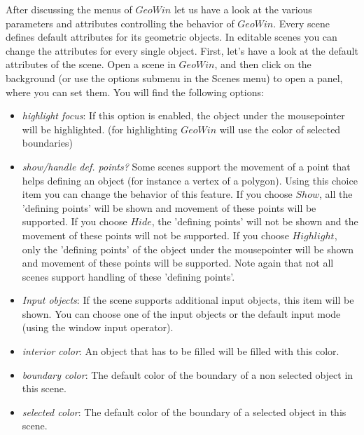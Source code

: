 After discussing the menus of $GeoWin$ let us have a look at the various parameters and attributes controlling
the behavior of $GeoWin$.
Every scene defines default attributes for its geometric objects. In editable scenes you can change the
attributes for every single object.
First, let's have a look at the default attributes of the scene. Open a scene in $GeoWin$, and then click on the 
background (or use the options submenu in the Scenes menu) to open a panel, where you can set them. You will find the following
options:

\begin{itemize}

\item {\em highlight focus}: If this option is enabled, the object under the mousepointer will be highlighted.
                 (for highlighting $GeoWin$ will use the color of selected boundaries)
		 
\item {\em show/handle def. points?} Some scenes support the movement of a point that helps defining
                 an object (for instance a vertex of a polygon). Using this choice item you can change
		 the behavior of this feature. If you choose $Show$, all the 'defining points' will be
		 shown and movement of these points will be supported. If you choose $Hide$, the
		 'defining points' will not be shown and the movement of these points will not be
		 supported. If you choose $Highlight$, only the 'defining points' of the object under
		 the mousepointer will be shown and movement of these points will be supported.
		 Note again that not all scenes support handling of these 'defining points'.
		 
\item {\em Input objects}: If the scene supports additional input objects, this item will be shown.
                 You can choose one of the input objects or the default input mode (using the 
		 window input operator).
             
\item {\em interior color}: An object that has to be filled will be filled with this color.
             
\item {\em boundary color}: The default color of the boundary of a non selected object in this scene.
                 
\item {\em selected color}: The default color of the boundary of a selected object in this scene.


\end{itemize}

